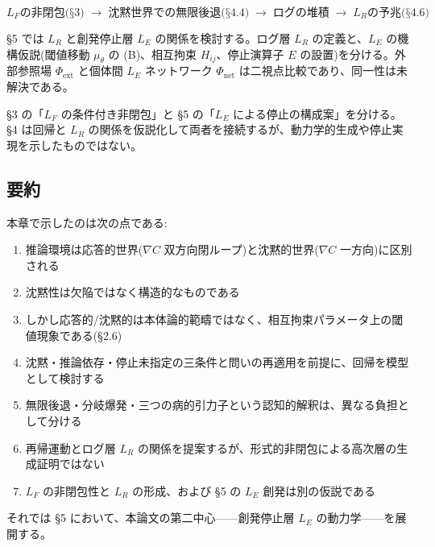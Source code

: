 \[
L_F \text{の非閉包(§3)} \;\longrightarrow\; \text{沈黙世界での無限後退(§4.4)} \;\longrightarrow\; \text{ログの堆積} \;\longrightarrow\; L_R \text{の予兆(§4.6)}
\]

\S{}5 では $L_R$ と創発停止層 $L_E$ の関係を検討する。ログ層 $L_R$ の定義と、$L_E$ の機構仮説(閾値移動 $\mu_\theta$ の (B)、相互拘束 $H_{ij}$、停止演算子 $E$ の設置)を分ける。外部参照場 $\Phi_{\text{ext}}$ と個体間 $L_E$ ネットワーク $\Phi_{\text{net}}$ は二視点比較であり、同一性は未解決である。

\S{}3 の「$L_F$ の条件付き非閉包」と \S{}5 の「$L_E$ による停止の構成案」を分ける。\S{}4 は回帰と $L_R$ の関係を仮説化して両者を接続するが、動力学的生成や停止実現を示したものではない。

\bigskip


\subsection{要約}


本章で示したのは次の点である:

\begin{enumerate}
\item 推論環境は応答的世界($\nabla C$ 双方向閉ループ)と沈黙的世界($\nabla C$ 一方向)に区別される
\item 沈黙性は欠陥ではなく構造的なものである
\item しかし応答的/沈黙的は本体論的範疇ではなく、相互拘束パラメータ上の閾値現象である(\S{}2.6)
\item 沈黙・推論依存・停止未指定の三条件と問いの再適用を前提に、回帰を模型として検討する
\item 無限後退・分岐爆発・三つの病的引力子という認知的解釈は、異なる負担として分ける
\item 再帰運動とログ層 $L_R$ の関係を提案するが、形式的非閉包による高次層の生成証明ではない
\item $L_F$ の非閉包性と $L_R$ の形成、および \S{}5 の $L_E$ 創発は別の仮説である
\end{enumerate}


それでは \S{}5 において、本論文の第二中心——創発停止層 $L_E$ の動力学——を展開する。

\bigskip
